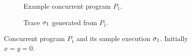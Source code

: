 
\begin{figure}[t]
\centering
\begin{subfigure}{.5\textwidth}
  \centering
  \caption{Example concurrent program $P_1$.}
  \label{fig:program1}
\end{subfigure}%
\begin{subfigure}{.5\textwidth}
  \centering
  \vspace{0.15in}
  \caption{Trace $\sigma_1$ generated from $P_1$.}
  \label{fig:trace1}
\end{subfigure}
\caption{Concurrent program $P_1$ and its sample execution
  $\sigma_1$. Initially $x = y = 0$.}
\label{fig:example1}
\end{figure}
